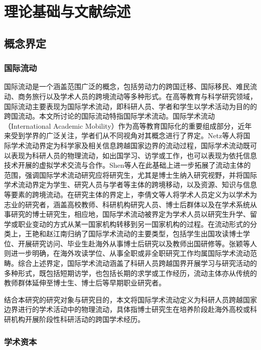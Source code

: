 \chapter{理论基础与文献综述}

\section{概念界定}

\subsection{国际流动}

国际流动是一个涵盖范围广泛的概念，包括劳动力的跨国迁移、国际移民、难民流动、商务旅行以及学术人员的跨境流动等多种形式。在高等教育与科学研究领域，国际流动主要表现为国际学术流动，即科研人员、学者和学生以学术活动为目的的跨国流动。本文所讨论的国际流动特指国际学术流动。国际学术流动（International Academic Mobility）作为高等教育国际化的重要组成部分，近年来受到学界的广泛关注，学者们从不同视角对其概念进行了界定。Netz等人将国际学术流动界定为科学家及相关信息跨越国家边界的流动过程\cite{netz2020}，国际学术流动既可以表现为科研人员的物理流动，如出国学习、访学或工作，也可以表现为依托信息技术开展的虚拟学术交流与合作。Shen等人在此基础上进一步拓展了流动主体的范围，强调国际学术流动研究应将研究生，尤其是博士生纳入研究视野，并将国际学术流动界定为学生、研究人员与学者等主体的跨境移动，以及资源、知识与信息等要素的跨境流动\cite{shen2022}。在研究主体的界定上，李倩文等人将学术人员定义为以学术为志业的研究者，涵盖高校教师、科研机构研究人员、博士后群体以及在学术系统从事研究的博士研究生，相应地，国际学术流动被界定为学术人员以研究生升学、留学或职业变动的方式从某一国家机构转移到另一国家机构的过程\cite{liqianwen2023}。在流动形式的分类上，王艳和赵江南归纳了国际学术流动的主要类型\cite{wangyan2026}，包括学生出国攻读博士学位、开展研究访问、毕业生赴海外从事博士后研究以及教师出国研修等。张颖等人则进一步明确，在海外攻读学位、从事全职或非全职研究工作均属国际学术流动范畴\cite{zhangying2024}。综合上述界定，国际学术流动涵盖了科研人员跨越国界开展学习与研究活动的多种形式，既包括短期访学，也包括长期的求学或工作经历，流动主体亦从传统的教师群体延伸至博士生、博士后等早期职业研究者。

结合本研究的研究对象与研究目的，本文将国际学术流动定义为科研人员跨越国家边界进行的学术活动中的物理流动，具体指博士研究生在培养阶段赴海外高校或科研机构开展阶段性科研活动的跨国学术经历。

\subsection{学术资本}

